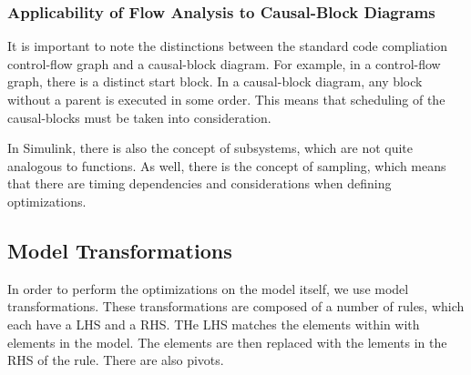 \subsubsection{Applicability of Flow Analysis to Causal-Block Diagrams}

It is important to note the distinctions between the standard code compliation control-flow graph and a causal-block diagram. For example, in a control-flow graph, there is a distinct start block. In a causal-block diagram, any block without a parent is executed in some order. This means that scheduling of the causal-blocks must be taken into consideration.

In Simulink, there is also the concept of subsystems, which are not quite analogous to functions. As well, there is the concept of sampling, which means that there are timing dependencies and considerations when defining optimizations.

\subsection{Model Transformations}

In order to perform the optimizations on the model itself, we use model transformations. These transformations are composed of a number of rules, which each have a LHS and a RHS. THe LHS matches the elements within with elements in the model. The elements are then replaced with the lements in the RHS of the rule. There are also pivots.
